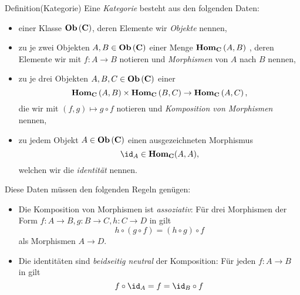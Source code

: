 \documentclass{article}
\begin{document}
		Definition(Kategorie)\cite[Definition 2.2.2]{Bra}
		Eine \emph{Kategorie} \CatC besteht aus den folgenden Daten:
		\begin{itemize}
			\item einer Klasse \(  \mathbf{Ob}  \left( \mathbf{C} \right) \), deren Elemente wir \emph{Objekte} nennen,
			\item zu je zwei Objekten 
			\begin{math}
				A,B \in  \mathbf{Ob}  \left( \mathbf{C}  \right) 
			\end{math}
			einer Menge 
			\begin{math}
				 \mathbf{Hom } _\mathbf{C} \left( A,B \right) 
			\end{math}
			, deren Elemente wir mit 
			\begin{math}
				f : A \to B 
			\end{math}
			notieren und \emph{Morphismen} von $ A $ nach $ B $ nennen,
			\item zu je drei Objekten 
			\begin{math}
		 A,B,C \in  \mathbf{Ob}  \left( \mathbf{C}  \right) 
			\end{math}	
			einer \Abb 
			\begin{displaymath}
				 \mathbf{Hom } _\mathbf{C} \left( A,B \right) \times  \mathbf{Hom } _\mathbf{C} \left( B,C \right) \to  \mathbf{Hom } _\mathbf{C} \left( A,C \right) ,
			\end{displaymath}
			die wir mit 
			\begin{math}
				\left( f,g \right) \mapsto g \circ f
			\end{math}
			notieren und \emph{Komposition von Morphismen} nennen, 
		\item zu jedem Objekt 
			\begin{math}
				A \in  \mathbf{Ob}  \left( \mathbf{C} \right)
			\end{math} 	
			einen ausgezeichneten Morphismus 
			\begin{displaymath}
				\id_A \in \Hom_\CatC ( A,A) ,
			\end{displaymath}
			welchen wir die \emph{identit\"at} nennen.
		\end{itemize}
		Diese Daten m\"ussen den folgenden Regeln gen\"ugen:
		\begin{itemize}
			\item Die Komposition von Morphismen ist \emph{assoziativ}: F\"ur drei Morphismen der Form
			\begin{math}
				f: A \to B , g: B \to C, h:C \to D 
			\end{math}
			in \CatC gilt 
			\begin{displaymath}
				h \circ \left( g \circ f \right) = \left( h \circ g \right) \circ f
			\end{displaymath}
			als Morphismen
			\begin{math}
				A \to D.
			\end{math}
			\item Die identit\"aten sind \emph{beidseitig neutral} \bzgl der Komposition: F\"ur jeden \Mor 
			\begin{math}
				f: A \to B
			\end{math}
			in \CatC gilt
			\begin{displaymath}
				f \circ \id_A = f = \id_B \circ f
			\end{displaymath}
		\end{itemize}
\end{document}
